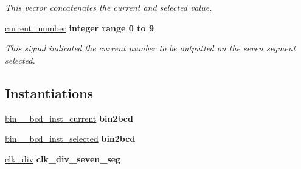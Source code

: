 \begin{DoxyCompactItemize}
\begin{DoxyCompactList}\small\item\em This vector concatenates the current and selected value. \end{DoxyCompactList}\item 
\hypertarget{classseven__seg__control_1_1seven__crtl_ae3191418b7808fc159102056426355ad}{\hyperlink{classseven__seg__control_1_1seven__crtl_ae3191418b7808fc159102056426355ad}{current\-\_\-number} {\bfseries \textcolor{comment}{integer}\textcolor{vhdlchar}{ }\textcolor{vhdlkeyword}{range}\textcolor{vhdlchar}{ } \textcolor{vhdldigit}{0} \textcolor{vhdlchar}{ }\textcolor{vhdlchar}{ }\textcolor{vhdlchar}{ }\textcolor{vhdlkeyword}{to}\textcolor{vhdlchar}{ }\textcolor{vhdlchar}{ }\textcolor{vhdlchar}{ } \textcolor{vhdldigit}{9} \textcolor{vhdlchar}{ }} }\label{classseven__seg__control_1_1seven__crtl_ae3191418b7808fc159102056426355ad}

\begin{DoxyCompactList}\small\item\em This signal indicated the current number to be outputted on the seven segment selected. \end{DoxyCompactList}\end{DoxyCompactItemize}
\subsection*{Instantiations}
 \begin{DoxyCompactItemize}
\item 
\hypertarget{classseven__seg__control_1_1seven__crtl_a4f65bad50a70c230d8cab7826ca467b3}{\hyperlink{classseven__seg__control_1_1seven__crtl_a4f65bad50a70c230d8cab7826ca467b3}{bin\-\_\-\_\-bcd\-\_\-inst\-\_\-current}  {\bfseries bin2bcd}   }\label{classseven__seg__control_1_1seven__crtl_a4f65bad50a70c230d8cab7826ca467b3}

\item 
\hypertarget{classseven__seg__control_1_1seven__crtl_a175226958b1074f166ae2f0324937b3b}{\hyperlink{classseven__seg__control_1_1seven__crtl_a175226958b1074f166ae2f0324937b3b}{bin\-\_\-\_\-bcd\-\_\-inst\-\_\-selected}  {\bfseries bin2bcd}   }\label{classseven__seg__control_1_1seven__crtl_a175226958b1074f166ae2f0324937b3b}

\item 
\hypertarget{classseven__seg__control_1_1seven__crtl_a39b27375c53f9cfc5759f4a53877ba0b}{\hyperlink{classseven__seg__control_1_1seven__crtl_a39b27375c53f9cfc5759f4a53877ba0b}{clk\-\_\-div}  {\bfseries clk\-\_\-div\-\_\-seven\-\_\-seg}   }\label{classseven__seg__control_1_1seven__crtl_a39b27375c53f9cfc5759f4a53877ba0b}

\end{DoxyCompactItemize}


